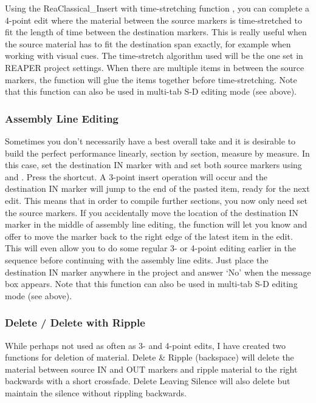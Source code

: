 \documentclass[10pt,american]{article}
\begin{document}
Using the ReaClassical\_Insert with time-stretching function  , you can
complete a 4-point edit where the material between the source markers is
time-stretched to fit the length of time between the destination markers. This
is really useful when the source material has to fit the destination span
exactly, for example when working with visual cues. The time-stretch algorithm
used will be the one set in REAPER project settings. When there are multiple
items in between the source markers, the function will glue the items together
before time-stretching. Note that this function can also be used in multi-tab
S-D editing mode (see above).

\subsubsection{Assembly Line Editing}

Sometimes you don't necessarily have a best overall take and it is desirable to
build the perfect performance linearly, section by section, measure by measure.
In this case, set the destination IN marker with  and set both source
markers using  and . Press the  shortcut. A 3-point
insert operation will occur and the destination IN marker will jump to the end
of the pasted item, ready for the next edit. This means that in order to compile
further sections, you now only need set the source markers. If you accidentally
move the location of the destination IN marker in the middle of assembly line
editing, the function will let you know and offer to move the marker back to the
right edge of the latest item in the edit. This will even allow you to do some
regular 3- or 4-point editing earlier in the sequence before continuing with the
assembly line edits. Just place the destination IN marker anywhere in the
project and answer `No' when the message box appears. Note that this function
can also be used in multi-tab S-D editing mode (see above).

\subsubsection{Delete / Delete with Ripple}

While perhaps not used as often as 3- and 4-point edits, I have created two
functions for deletion of material. Delete \& Ripple \keys{\backspace}
(backspace) will delete the material between source IN and OUT markers and
ripple material to the right backwards with a short crossfade. Delete Leaving
Silence \keys{\ctrl+\backspace} will also delete but maintain the silence
without rippling backwards.
\end{document}
